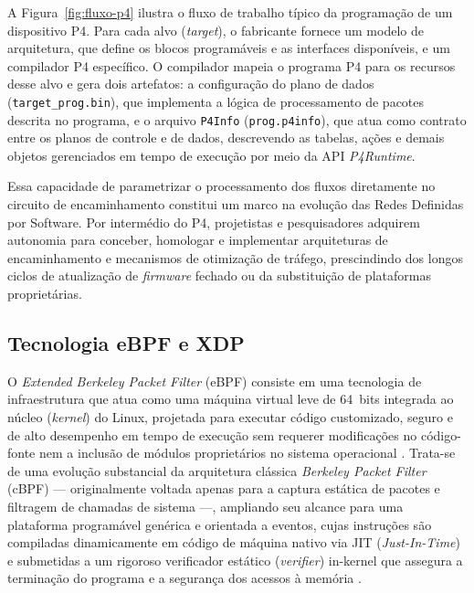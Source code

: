 A Figura~\ref{fig:fluxo-p4} ilustra o fluxo de trabalho típico da programação de um dispositivo P4. Para cada alvo (\textit{target}), o fabricante fornece um modelo de arquitetura, que define os blocos programáveis e as interfaces disponíveis, e um compilador P4 específico. O compilador mapeia o programa P4 para os recursos desse alvo e gera dois artefatos: a configuração do plano de dados (\texttt{target\_prog.bin}), que implementa a lógica de processamento de pacotes descrita no programa, e o arquivo \texttt{P4Info} (\texttt{prog.p4info}), que atua como contrato entre os planos de controle e de dados, descrevendo as tabelas, ações e demais objetos gerenciados em tempo de execução por meio da API \textit{P4Runtime}.

Essa capacidade de parametrizar o processamento dos fluxos diretamente no circuito de encaminhamento constitui um marco na evolução das Redes Definidas por Software. Por intermédio do P4, projetistas e pesquisadores adquirem autonomia para conceber, homologar e implementar arquiteturas de encaminhamento e mecanismos de otimização de tráfego, prescindindo dos longos ciclos de atualização de \textit{firmware} fechado ou da substituição de plataformas proprietárias.

\subsection{Tecnologia eBPF e XDP}
\label{subsec:tecnologia_ebpf}

O \textit{Extended Berkeley Packet Filter} (eBPF) consiste em uma tecnologia de infraestrutura que atua como uma máquina virtual leve de 64~bits integrada ao núcleo (\textit{kernel}) do Linux, projetada para executar código customizado, seguro e de alto desempenho em tempo de execução sem requerer modificações no código-fonte nem a inclusão de módulos proprietários no sistema operacional \cite{sharaf2022extended}. Trata-se de uma evolução substancial da arquitetura clássica \textit{Berkeley Packet Filter} (cBPF) --- originalmente voltada apenas para a captura estática de pacotes e filtragem de chamadas de sistema ---, ampliando seu alcance para uma plataforma programável genérica e orientada a eventos, cujas instruções são compiladas dinamicamente em código de máquina nativo via JIT (\textit{Just-In-Time}) e submetidas a um rigoroso verificador estático (\textit{verifier}) in-kernel que assegura a terminação do programa e a segurança dos acessos à memória \cite{di2019berkeley}.

